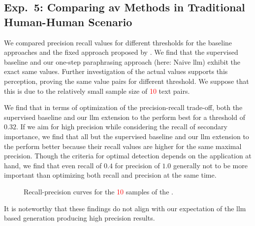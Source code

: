\subsection{Exp.\ 5: Comparing \acs{av} Methods in Traditional Human-Human Scenario}
\label{subsec:imp_gen_res}

We compared precision recall values for different thresholds for the baseline approaches and the fixed approach proposed by \citet{koppel_determining_2014}.
We find that the supervised baseline and our one-step paraphrasing approach (here: Naive \ac{llm}) exhibit the exact same values.
Further investigation of the actual values supports this perception, proving the same value pairs for different threshold.
We suppose that this is due to the relatively small sample size of \textcolor{red}{10} text pairs.

We find that in terms of optimization of the precision-recall trade-off, both the supervised baseline and our \ac{llm} extension to the \impAppr{} perform best for a threshold of $0.32$.
If we aim for high precision while considering the recall of secondary importance, we find that all but the supervised baseline and our \ac{llm} extension to the \impAppr{} perform better because their recall values are higher for the same maximal precision.
Though the criteria for optimal detection depends on the application at hand, we find that even recall of $0.4$ for precision of $1.0$ generally not to be more important than optimizing both recall and precision at the same time.

\begin{figure}[htbp]
    \centering
    
    \caption[Recall-precision curves for the \dataStudent{}.]{Recall-precision curves for the \textcolor{red}{10} samples of the \dataStudent{}.}
    \label{fig:sem_syn_blog}
\end{figure}

It is noteworthy that these findings do not align with our expectation of the \ac{llm} based \imp{} generation producing high precision results.
